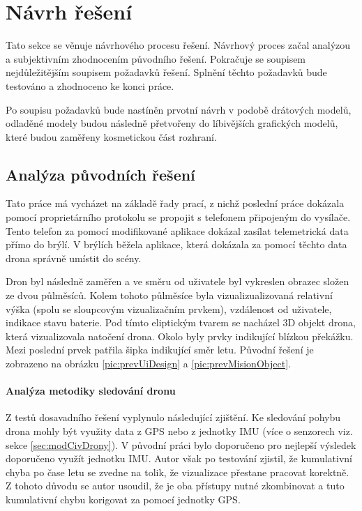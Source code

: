 \chapter{Návrh řešení}
Tato sekce se věnuje návrhového procesu řešení. Návrhový proces začal analýzou a subjektivním zhodnocením původního řešení. Pokračuje se soupisem nejdůležitějším soupisem požadavků řešení. Splnění těchto požadavků bude testováno a zhodnoceno ke konci práce.

Po soupisu požadavků bude nastíněn prvotní návrh v podobě drátových modelů, odladěné modely budou následně přetvořeny do líbivějších grafických modelů, které budou zaměřeny kosmetickou část rozhraní.
\section{Analýza původních řešení}
Tato práce má vycházet na základě řady prací, z nichž poslední práce \cite{KyjacMartin2022Vnpp} dokázala pomocí proprietárního protokolu se propojit s telefonem připojeným do vysílače. Tento telefon za pomocí modifikované aplikace dokázal zasílat telemetrická data přímo do brýlí. V brýlích běžela aplikace, která dokázala za pomocí těchto data drona správně umístit do scény. 

Dron byl následně zaměřen a ve směru od uživatele byl vykreslen obrazec složen ze dvou půlměsíců. Kolem tohoto půlměsíce byla vizualizualizovaná relativní výška (spolu se sloupcovým vizualizačním prvkem), vzdálenost od uživatele, indikace stavu baterie. Pod tímto eliptickým tvarem se nacházel 3D objekt drona, která vizualizovala natočení drona. Okolo byly prvky indikující blízkou překážku. Mezi poslední prvek patřila šipka indikující směr letu. Původní řešení je zobrazeno na obrázku \ref{pic:prevUiDesign} a \ref{pic:prevMisionObject}.

\subsubsection{Analýza metodiky sledování dronu}
Z testů dosavadního řešení vyplynulo následující zjištění. Ke sledování pohybu drona mohly být využity data z GPS nebo z jednotky IMU (více o senzorech viz. sekce \ref{sec:modCivDrony}). V původní práci bylo doporučeno pro nejlepší výsledek doporučeno využít jednotku IMU. Autor však po testování zjistil, že kumulativní chyba po čase letu se zvedne na tolik, že vizualizace přestane pracovat korektně. Z tohoto důvodu se autor usoudil, že je oba přístupy nutné zkombinovat a tuto kumulativní chybu korigovat za pomocí jednotky GPS.

